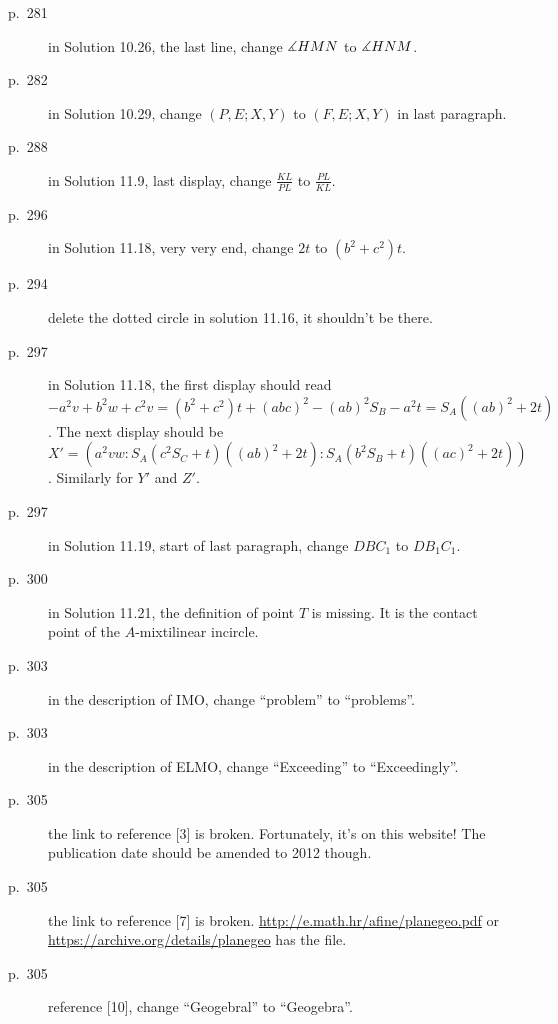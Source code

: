 \documentclass[11pt]{scrartcl}
\begin{document}
\begin{description}
\item[p.\  281] in Solution 10.26, the last line, change $\measuredangle HMN$ to $\measuredangle HNM$.
\item[p.\  282] in Solution 10.29, change $(P,E;X,Y)$ to $(F,E;X,Y)$ in last paragraph.
\item[p.\  288] in Solution 11.9, last display, change $\frac{KL}{PL}$ to $\frac{PL}{KL}$.
\item[p.\  296] in Solution 11.18, very very end, change $2t$ to $(b^2+c^2)t$.
\item[p.\  294] delete the dotted circle in solution 11.16, it shouldn't be there.
\item[p.\  297] in Solution 11.18, the first display should read
  $-a^2v + b^2w + c^2v = (b^2+c^2)t + (abc)^2 - (ab)^2S_B - a^2t = S_A ((ab)^2 + 2t)$.
  The next display should be
  $X' = \left( a^2vw : S_A(c^2S_C+t)((ab)^2+2t) : S_A(b^2S_B+t)((ac)^2+2t) \right)$.
  Similarly for $Y'$ and $Z'$.
\item[p.\  297] in Solution 11.19, start of last paragraph, change $DBC_1$ to $DB_1C_1$.
\item[p.\  300] in Solution 11.21, the definition of point $T$ is missing.
  It is the contact point of the $A$-mixtilinear incircle.
\item[p.\  303] in the description of IMO, change ``problem'' to ``problems''.
\item[p.\  303] in the description of ELMO, change ``Exceeding'' to ``Exceedingly''.
\item[p.\  305] the link to reference [3] is broken. Fortunately, it's on this website!
  The publication date should be amended to 2012 though.
\item[p.\  305] the link to reference [7] is broken. \url{http://e.math.hr/afine/planegeo.pdf}
  or \url{https://archive.org/details/planegeo} has the file.
\item[p.\  305] reference [10], change ``Geogebral'' to ``Geogebra''.
\end{description}
\end{document}
